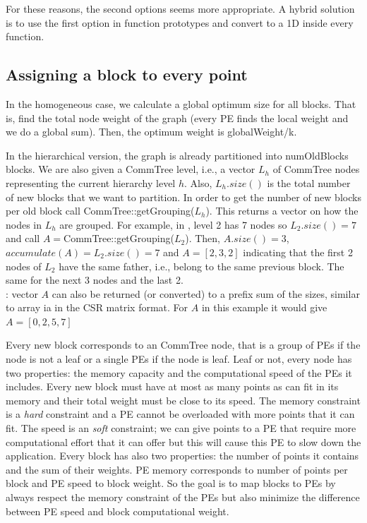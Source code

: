 \documentclass[a4paper,10pt]{article}
\newcommand{\red}[1]{{\color{red}{#1}}}
\newcommand{\blue}[1]{{\color{blue1}{#1}}}
\newcommand{\km}{$k$-means}
\newcommand{\todo}[1]{{\red{TODO}}: #1}
\begin{document}
For these reasons, the second options seems more appropriate.
A hybrid solution is to use the first option in function prototypes and convert to a 1D inside
every function. 



\subsection*{Assigning a block to every point}
\blue{Note that most of this section is more related to the multi-constraint \km\ version and less to
the hierarchical version}

In the homogeneous case, we calculate a global optimum size for all blocks. That is, find the total
node weight of the graph (every PE finds the local weight and we do a global sum). Then, the
optimum weight is globalWeight/k.

In the hierarchical version, the graph is already partitioned into numOldBlocks blocks. 
We are also given a CommTree level, i.e., a vector $L_h$ of CommTree nodes representing the current
hierarchy level $h$. Also, $L_h.size()$ is the total number of new blocks that we want to partition.
In order to get the number of new blocks per old block call CommTree::getGrouping($L_h$).
This returns a vector on how the nodes in $L_h$ are grouped. For example, in , 
level 2 has 7 nodes so $L_2.size()=7$ and call $A=$CommTree::getGrouping($L_2$).
Then, $A.size()=3$, $accumulate(A)=L_2.size()=7$ and $A=[2,3,2]$ indicating that the first 2 
nodes of $L_2$ have the same
father, i.e., belong to the same previous block. The same for the next 3 nodes and the last 2.
\\\todo{vector $A$ can also be returned (or converted) to a prefix sum of the sizes, similar to
array ia in the CSR matrix format. For $A$ in this example it would give $A=[0,2,5,7]$}

Every new block corresponds to an CommTree node, that is a group of PEs if the node is not a leaf
or a single PEs if the node is leaf. Leaf or not, every node has two properties: the memory capacity
and the computational speed of the PEs  it includes. Every new block must have at most as many
points as can fit in its memory and their total weight must be close to its speed. The memory
constraint is a \emph{hard} constraint and a PE cannot be overloaded with more points that it can fit. 
The speed is an \emph{soft} constraint; we can give points to a PE that require more
computational effort that it can offer but this will cause this PE to slow down the application.
Every block has also two properties: the number of points it contains and the sum of their weights.
PE memory corresponds to number of points per block and PE speed to block weight.
So the goal is to map blocks to PEs by always respect the memory constraint of the PEs but also
minimize the difference between PE speed and block computational weight.
\end{document}
